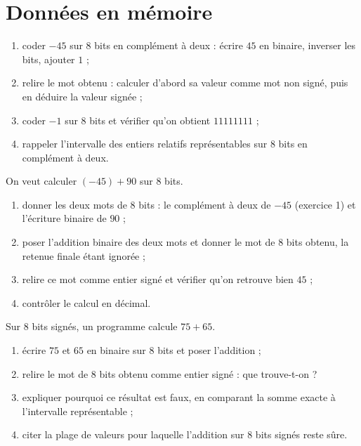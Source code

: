 \clearpage
\chapter{Données en mémoire}

\begin{exercice}
\begin{enumerate}
\item coder $-45$ sur $8$ bits en complément à deux : écrire $45$ en binaire, inverser les bits, ajouter $1$ ;
\item relire le mot obtenu : calculer d'abord sa valeur comme mot non signé, puis en déduire la valeur signée ;
\item coder $-1$ sur $8$ bits et vérifier qu'on obtient $11111111$ ;
\item rappeler l'intervalle des entiers relatifs représentables sur $8$ bits en complément à deux.
\end{enumerate}
\end{exercice}

\begin{exercice}
On veut calculer $(-45) + 90$ sur $8$ bits.
\begin{enumerate}
\item donner les deux mots de $8$ bits : le complément à deux de $-45$ (exercice 1) et l'écriture binaire de $90$ ;
\item poser l'addition binaire des deux mots et donner le mot de $8$ bits obtenu, la retenue finale étant ignorée ;
\item relire ce mot comme entier signé et vérifier qu'on retrouve bien $45$ ;
\item contrôler le calcul en décimal.
\end{enumerate}
\end{exercice}

\begin{exercice}
Sur $8$ bits signés, un programme calcule $75 + 65$.
\begin{enumerate}
\item écrire $75$ et $65$ en binaire sur $8$ bits et poser l'addition ;
\item relire le mot de $8$ bits obtenu comme entier signé : que trouve-t-on ?
\item expliquer pourquoi ce résultat est faux, en comparant la somme exacte à l'intervalle représentable ;
\item citer la plage de valeurs pour laquelle l'addition sur $8$ bits signés reste sûre.
\end{enumerate}
\end{exercice}

